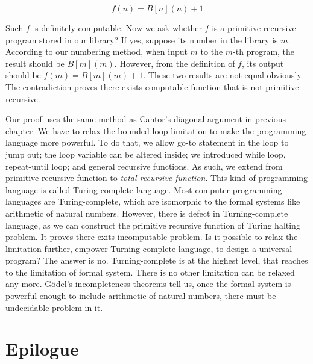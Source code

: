 \documentclass{article}
\begin{document}
\[
f(n) = B[n](n) + 1
\]

Such $f$ is definitely computable. Now we ask whether $f$ is a primitive recursive program stored in our library? If yes, suppose its number in the library is $m$. According to our numbering method, when input $m$ to the $m$-th program, the result should be $B[m](m)$. However, from the definition of $f$, its output should be $f(m) = B[m](m) + 1$. These two results are not equal obviously. The contradiction proves there exists computable function that is not primitive recursive.

Our proof uses the same method as Cantor's diagonal argument in previous chapter. We have to relax the bounded loop limitation to make the programming language more powerful. To do that, we allow go-to statement in the loop to jump out; the loop variable can be altered inside; we introduced while loop, repeat-until loop; and general recursive functions. As such, we extend from primitive recursive function to {\em total recursive function}. This kind of programming language is called Turing-complete language. Most computer programming languages are Turing-complete, which are isomorphic to the formal systems like arithmetic of natural numbers. However, there is defect in Turning-complete language, as we can construct the primitive recursive function of Turing halting problem. It proves there exits incomputable problem. Is it possible to relax the limitation further, empower Turning-complete language, to design a universal program? The answer is no. Turning-complete is at the highest level, that reaches to the limitation of formal system. There is no other limitation can be relaxed any more. Gödel's incompleteness theorems tell us, once the formal system is powerful enough to include arithmetic of natural numbers, there must be undecidable problem in it.

\section{Epilogue}
\end{document}
